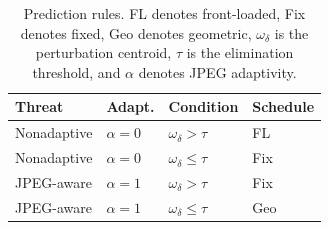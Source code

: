 \begin{table}[t]
\caption{Prediction rules. FL denotes front-loaded, Fix denotes fixed, Geo denotes geometric, \(\omega_\delta\) is the perturbation centroid, \(\tau\) is the elimination threshold, and \(\alpha\) denotes JPEG adaptivity.}
\label{tab:prediction-rules}
\centering
\scriptsize
\begin{tabular}{llll}
\hline
Threat & Adapt. & Condition & Schedule \\
\hline
Nonadaptive & \(\alpha=0\) & \(\omega_\delta>\tau\) & FL \\
Nonadaptive & \(\alpha=0\) & \(\omega_\delta\le\tau\) & Fix \\
JPEG-aware & \(\alpha=1\) & \(\omega_\delta>\tau\) & Fix \\
JPEG-aware & \(\alpha=1\) & \(\omega_\delta\le\tau\) & Geo \\
\hline
\end{tabular}
\end{table}
